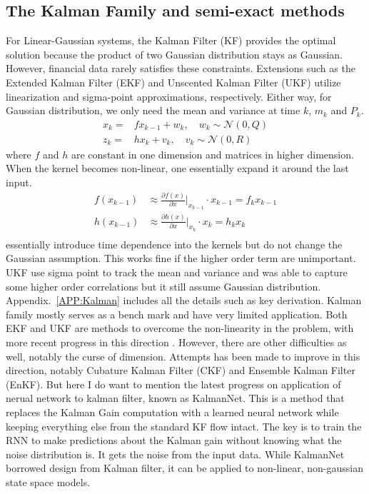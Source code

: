 \documentclass{article}
\begin{document}
\subsection{The Kalman Family and semi-exact methods}
For Linear-Gaussian systems, the Kalman Filter (KF) provides the optimal solution because the product of two Gaussian distribution stays as Gaussian. However, financial data rarely satisfies these constraints. Extensions such as the Extended Kalman Filter (EKF) and Unscented Kalman Filter (UKF) utilize linearization and sigma-point approximations, respectively. Either way, for Gaussian distribution, we only need the mean and variance at time $k$, $m_k$ and $P_k$. 
\begin{equation}
\begin{split}
x_k =& f x_{k-1} + w_k, \quad w_k \sim \mathcal{N}(0, Q) \\
z_k =& h x_k + v_k, \quad v_k \sim \mathcal{N}(0, R)
\end{split}
\end{equation}
where $f$ and $h$ are constant in one dimension and matrices in higher dimension. When the kernel becomes non-linear, one essentially expand it around the last input. 
\begin{equation}
\begin{split}
    f(x_{k-1}) &\approx \frac{\partial f(x)}{\partial x} \Big|_{x_{k-1}} \cdot x_{k-1} =f_{k} x_{k-1} \\
    h(x_{k-1}) &\approx \frac{\partial h(x)}{\partial x} \Big|_{x_{k}} \cdot x_{k} =h_{k} x_{k} \\
\end{split}
\end{equation}
essentially introduce time dependence into the kernels but do not change the Gaussian assumption. This works fine if the higher order term are unimportant. UKF use sigma point to track the mean and variance and was able to capture some higher order correlations but it still assume Gaussian distribution. Appendix.~\ref{APP:Kalman} includes all the details such as key derivation. Kalman family mostly serves as a bench mark and have very limited application. Both EKF and UKF are methods to overcome the non-linearity in the problem, with more recent progress in this direction \cite{jiang2025new}. However, there are other difficulties as well, notably the curse of dimension. Attempts has been made to improve in this direction, notably Cubature Kalman Filter (CKF)\cite{arasaratnam2009cubature} and Ensemble Kalman Filter (EnKF)\cite{evensen-2003-ensemble-kalman-filter,alghattas2024ensemble}. But here I do want to mention the latest progress on application of nerual network to kalman filter, known as KalmanNet\cite{DBLP:journals/corr/abs-2107-10043,mortada2025recursive}. This is a method that replaces the Kalman Gain computation with a learned neural network while keeping everything else from the standard KF flow intact. The key is to train the RNN to make predictions about the Kalman gain without knowing what the noise distribution is. It gets the noise from the input data. While KalmanNet borrowed design from Kalman filter, it can be applied to non-linear, non-gaussian state space models. 
\end{document}
